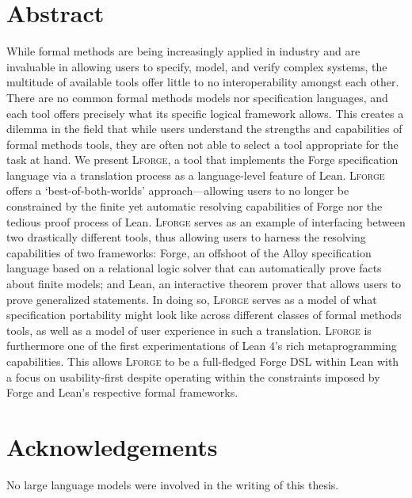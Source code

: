 \newpage
\section*{Abstract}
While formal methods are being increasingly applied in industry and are invaluable in allowing users to specify, model, and verify complex systems, the multitude of available tools offer little to no interoperability amongst each other. 
There are no common formal methods models nor specification languages, and each tool offers precisely what its specific logical framework allows. 
This creates a dilemma in the field that while users understand the strengths and capabilities of formal methods tools, they are often not able to select a tool appropriate for the task at hand. 
We present \textsc{Lforge}, a tool that implements the Forge specification language via a translation process as a language-level feature of Lean. 
\textsc{Lforge} offers a `best-of-both-worlds' approach---allowing users to no longer be constrained by the finite yet automatic resolving capabilities of Forge nor the tedious proof process of Lean.
\textsc{Lforge} serves as an example of interfacing between two drastically different tools, thus allowing users to harness the resolving capabilities of two frameworks: Forge, an offshoot of the Alloy specification language based on a relational logic solver that can automatically prove facts about finite models; and Lean, an interactive theorem prover that allows users to prove generalized statements. 
In doing so, \textsc{Lforge} serves as a model of what specification portability might look like across different classes of formal methods tools, as well as a model of user experience in such a translation. 
\textsc{Lforge} is furthermore one of the first experimentations of Lean 4's rich metaprogramming capabilities. This allows \textsc{Lforge} to be a full-fledged Forge DSL within Lean with a focus on usability-first despite operating within the constraints imposed by Forge and Lean's respective formal frameworks. 

\newpage
\section*{Acknowledgements}


No large language models were involved in the writing of this thesis.

\newpage
{
  \hypersetup{linkcolor=black}
  \tableofcontents
}

